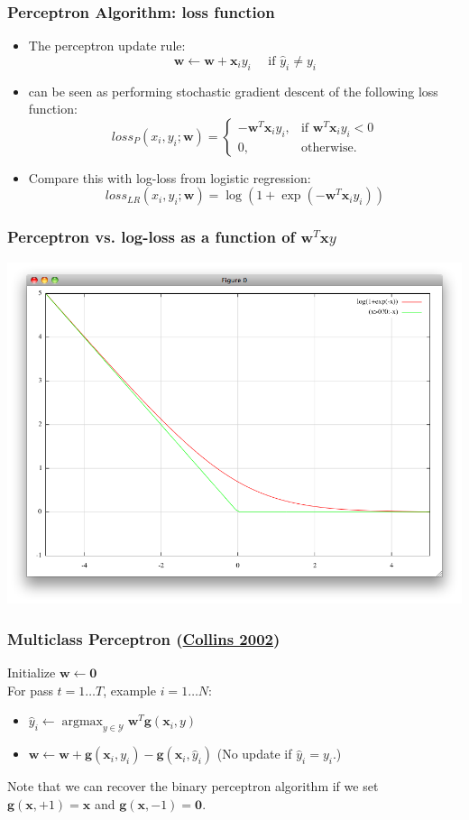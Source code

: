 \documentclass[ignorenonframetext,plain,fleqn]{beamer}
\DeclareMathOperator*{\argmax}{argmax}
\newcommand{\loss}{\mathit{loss}}
\renewcommand{\vec}{\mathbf}
\begin{document}
\begin{frame}\frametitle{Perceptron Algorithm: loss function}
\begin{itemize}
\item The perceptron update rule:
\[
\vec{w} \leftarrow \vec{w} 
+ \vec{x}_i y_i
\quad\text{ if } \hat{y}_i \neq y_i
\]
\item can be seen as performing stochastic gradient descent of the
  following loss function:
\[
\loss_P(x_i, y_i; \vec{w}) = \begin{cases}
-\vec{w}^T\vec{x}_i y_i,& \text{if } \vec{w}^T\vec{x}_i y_i<0 \\
0,& \text{otherwise.}
\end{cases}
\]
\item Compare this with log-loss from logistic regression: \[
  \loss_{LR}(x_i, y_i; \vec{w}) = \log(1 + \exp(-\vec{w}^T\vec{x}_i y_i))
\]
\end{itemize}
\end{frame}

\begin{frame}\frametitle{Perceptron vs. log-loss as a function of
    $\vec{w}^T\vec{x} y$}
\includegraphics[width=\textwidth]{images/perceptron-loss.png}
\end{frame}


\begin{frame}\frametitle{Multiclass Perceptron
(\href{http://aclweb.org/anthology//W/W02/W02-1001.pdf}{Collins 2002})} %
Initialize $\vec{w} \leftarrow \vec{0}$\\
For pass $t=1\dots T$, example $i=1\dots N$:\\
\begin{itemize}
\item $\hat{y}_i \leftarrow \argmax_{y\in\mathcal{Y}}
    \vec{w}^T\vec{g}(\vec{x}_i, y)$
\item $\vec{w} \leftarrow \vec{w} 
+\vec{g}(\vec{x}_i,y_i)
-\vec{g}(\vec{x}_i,\hat{y}_i)$ 
\hspace{10mm}
\small (No update if $\hat{y}_i=y_i$.)
\end{itemize}
\vspace{20mm}
Note that we can recover the binary perceptron algorithm if we set
$\vec{g}(\vec{x},+1)=\vec{x}$ and $\vec{g}(\vec{x},-1)=\vec{0}$.
\end{frame}
\end{document}
